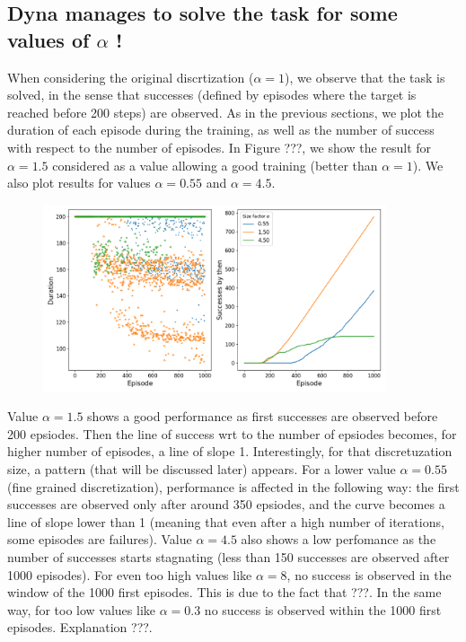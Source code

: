 \documentclass[a4paper, 12pt,oneside]{article}
\begin{document}
        \subsection{Dyna manages to solve the task for some values of $\alpha$ !}
        When considering the original discrtization ($\alpha=1$), we observe that the task is solved, in the sense that successes (defined by episodes where the target is reached before 200 steps) are observed. 
        As in the previous sections, we plot the duration of each episode during the training, as well as the number of success with respect to the number of episodes. 
        In Figure ???, we show the result for $\alpha=1.5$ considered as a value allowing a good training (better than $\alpha=1$). We also plot results for values $\alpha=0.55$ and $\alpha=4.5$. 
        
        \begin{figure}[h]
            \centering
            \includegraphics[width=0.9\textwidth]{../runs/dyna/dyna_comparison.png}
            \caption{}
        \end{figure}
        
        Value $\alpha=1.5$ shows a good performance as first successes are observed before 200 epsiodes. Then the line of success wrt to the number of epsiodes becomes, for higher number of episodes, a line of slope 1. Interestingly, for that discretuzation size, a pattern (that will be discussed later) appears. For a lower value $\alpha=0.55$ (fine grained discretization), performance is affected in the following way: the first successes are observed only after around 350 epsiodes, and the curve becomes a line of slope lower than 1 (meaning that even after a high number of iterations, some episodes are failures). 
        Value $\alpha=4.5$ also shows a low perfomance as the number of successes starts stagnating (less than 150 successes are observed after 1000 episodes). 
        For even too high values like $\alpha=8$, no success is observed in the window of the 1000 first episodes. This is due to the fact that ???.
        In the same way, for too low values like $\alpha=0.3$ no success is observed within the 1000 first episodes. Explanation ???. 
\end{document}
